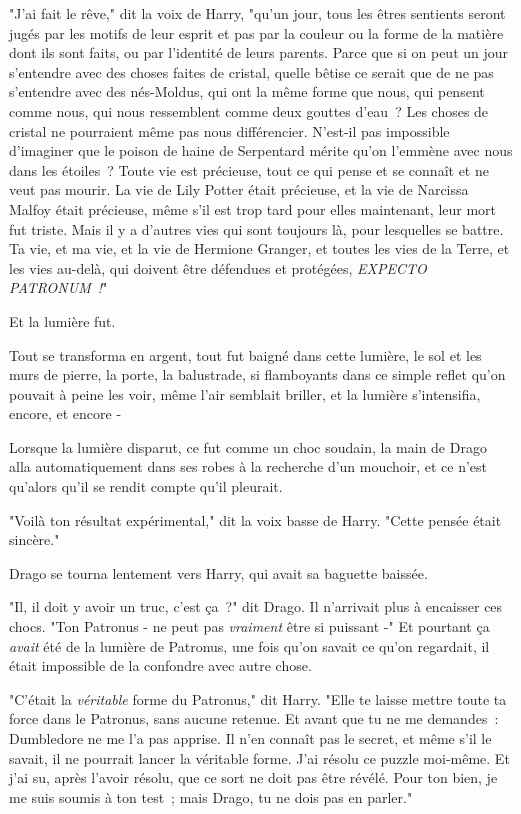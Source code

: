 "J'ai fait le rêve," dit la voix de Harry, "qu'un jour, tous les êtres sentients\footnotemark{} seront jugés par les motifs de leur esprit et pas par la couleur ou la forme de la matière dont ils sont faits, ou par l'identité de leurs parents. Parce que si on peut un jour s'entendre avec des choses faites de cristal, quelle bêtise ce serait que de ne pas s'entendre avec des nés-Moldus, qui ont la même forme que nous, qui pensent comme nous, qui nous ressemblent comme deux gouttes d'eau~? Les choses de cristal ne pourraient même pas nous différencier. N'est-il pas impossible d'imaginer que le poison de haine de Serpentard mérite qu'on l'emmène avec nous dans les étoiles~? Toute vie est précieuse, tout ce qui pense et se connaît et ne veut pas mourir. La vie de Lily Potter était précieuse, et la vie de Narcissa Malfoy était précieuse, même s'il est trop tard pour elles maintenant, leur mort fut triste. Mais il y a d'autres vies qui sont toujours là, pour lesquelles se battre. Ta vie, et ma vie, et la vie de Hermione Granger, et toutes les vies de la Terre, et les vies au-delà, qui doivent être défendues et protégées, \emph{EXPECTO PATRONUM~!}"

Et la lumière fut.

Tout se transforma en argent, tout fut baigné dans cette lumière, le sol et les murs de pierre, la porte, la balustrade, si flamboyants dans ce simple reflet qu'on pouvait à peine les voir, même l'air semblait briller, et la lumière s'intensifia, encore, et encore -

Lorsque la lumière disparut, ce fut comme un choc soudain, la main de Drago alla automatiquement dans ses robes à la recherche d'un mouchoir, et ce n'est qu'alors qu'il se rendit compte qu'il pleurait.

"Voilà ton résultat expérimental," dit la voix basse de Harry. "Cette pensée était sincère."

Drago se tourna lentement vers Harry, qui avait sa baguette baissée.

"Il, il doit y avoir un truc, c'est ça~?" dit Drago. Il n'arrivait plus à encaisser ces chocs. "Ton Patronus - ne peut pas \emph{vraiment} être si puissant -" Et pourtant ça \emph{avait} été de la lumière de Patronus, une fois qu'on savait ce qu'on regardait, il était impossible de la confondre avec autre chose.

"C'était la \emph{véritable} forme du Patronus," dit Harry. "Elle te laisse mettre toute ta force dans le Patronus, sans aucune retenue. Et avant que tu ne me demandes~: Dumbledore ne me l'a pas apprise. Il n'en connaît pas le secret, et même s'il le savait, il ne pourrait lancer la véritable forme. J'ai résolu ce puzzle moi-même. Et j'ai su, après l'avoir résolu, que ce sort ne doit pas être révélé. Pour ton bien, je me suis soumis à ton test~; mais Drago, tu ne dois pas en parler."

